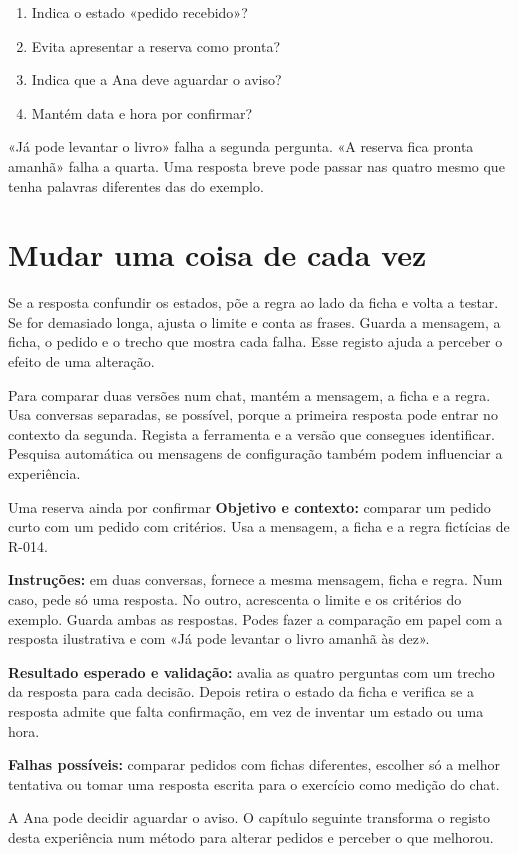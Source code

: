 \begin{enumerate}[leftmargin=*,nosep]
\item Indica o estado «pedido recebido»?
\item Evita apresentar a reserva como pronta?
\item Indica que a Ana deve aguardar o aviso?
\item Mantém data e hora por confirmar?
\end{enumerate}

«Já pode levantar o livro» falha a segunda pergunta. «A reserva fica pronta amanhã» falha a quarta. Uma resposta breve pode passar nas quatro mesmo que tenha palavras diferentes das do exemplo.

\section{Mudar uma coisa de cada vez}

Se a resposta confundir os estados, põe a regra ao lado da ficha e volta a testar. Se for demasiado longa, ajusta o limite e conta as frases. Guarda a mensagem, a ficha, o pedido e o trecho que mostra cada falha. Esse registo ajuda a perceber o efeito de uma alteração.

Para comparar duas versões num chat, mantém a mensagem, a ficha e a regra. Usa conversas separadas, se possível, porque a primeira resposta pode entrar no contexto da segunda. Regista a ferramenta e a versão que consegues identificar. Pesquisa automática ou mensagens de configuração também podem influenciar a experiência.

\begin{promptlabbox}{Uma reserva ainda por confirmar}
\textbf{Objetivo e contexto:} comparar um pedido curto com um pedido com critérios. Usa a mensagem, a ficha e a regra fictícias de R-014.

\textbf{Instruções:} em duas conversas, fornece a mesma mensagem, ficha e regra. Num caso, pede só uma resposta. No outro, acrescenta o limite e os critérios do exemplo. Guarda ambas as respostas. Podes fazer a comparação em papel com a resposta ilustrativa e com «Já pode levantar o livro amanhã às dez».

\textbf{Resultado esperado e validação:} avalia as quatro perguntas com um trecho da resposta para cada decisão. Depois retira o estado da ficha e verifica se a resposta admite que falta confirmação, em vez de inventar um estado ou uma hora.

\textbf{Falhas possíveis:} comparar pedidos com fichas diferentes, escolher só a melhor tentativa ou tomar uma resposta escrita para o exercício como medição do chat.
\end{promptlabbox}

A Ana pode decidir aguardar o aviso. O capítulo seguinte transforma o registo desta experiência num método para alterar pedidos e perceber o que melhorou.

